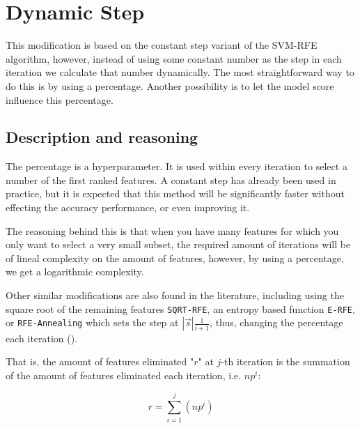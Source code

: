 
\newcommand{\VS}{\vspace{6pt}}
\newcommand{\vt}[1]{\vec{#1}}

\chapter{Dynamic Step} %

\label{Chapter1} %


This modification is based on the constant step variant of the SVM-RFE algorithm, however, instead of using some constant number as the step in each iteration we calculate that number dynamically. The most straightforward way to do this is by using a percentage. Another possibility is to let the model score influence this percentage.

\section{Description and reasoning}

The percentage is a hyperparameter. It is used within every iteration to select a number of the first ranked features. A constant step has already been used in pract\-ice, but it is expected that this method will be significantly faster without effecting the accuracy performance, or even improving it.

The reasoning behind this is that when you have many features for which you only want to select a very small subset, the required amount of iterations will be of lineal complexity on the amount of features, however, by using a percentage, we get a logarithmic complexity.

Other similar modifications are also found in the literature, including using the square root of the remaining features \texttt{SQRT-RFE}, an entropy based function \texttt{E-RFE}, or \texttt{RFE-Annealing} which sets the step at $|\vt{s}| \frac{1}{i+1}$, thus, changing the percentage each iteration (\cite{ding_improving_2006}).

\iffalse
That is, the amount of features eliminated "$r$" at $j$-th iteration is the summation of the amount of features eliminated each iteration, i.e. $np^i$:

\begin{equation}\label{eq:dynamicStep1}
    r = \sum_{i = 1}^{j}{(np^i)} 
\end{equation}

